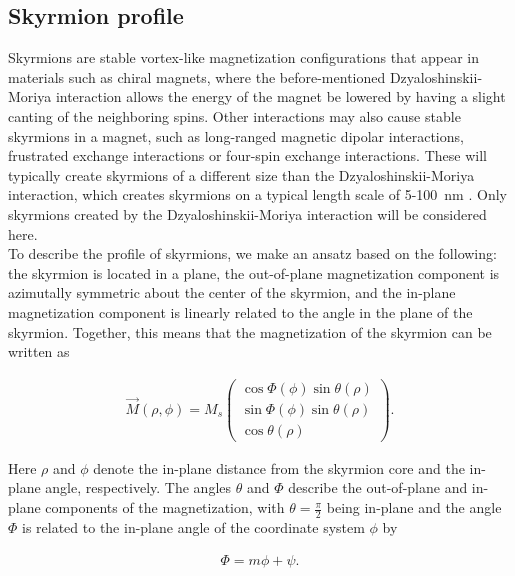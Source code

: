 \documentclass[1p]{elsarticle}		%
\numberwithin{equation}{section}
\begin{document}
\subsection{Skyrmion profile}
Skyrmions are stable vortex-like magnetization configurations that appear in materials such as chiral magnets, where the before-mentioned Dzyaloshinskii-Moriya interaction allows the energy of the magnet be lowered by having a slight canting of the neighboring spins. Other interactions may also cause stable skyrmions in a magnet, such as long-ranged magnetic dipolar interactions, frustrated exchange interactions or four-spin exchange interactions. These will typically create skyrmions of a different size than the Dzyaloshinskii-Moriya interaction, which creates skyrmions on a typical length scale of 5-\SI{100}{nm} \cite{Nagaosa2013}. Only skyrmions created by the Dzyaloshinskii-Moriya interaction will be considered here. \\
To describe the profile of skyrmions, we make an ansatz based on the following: the skyrmion is located in a plane, the out-of-plane magnetization component is azimutally symmetric about the center of the skyrmion, and the in-plane magnetization component is linearly related to the angle in the plane of the skyrmion. Together, this means that the magnetization of the skyrmion can be written as

\begin{align}
\label{eq:SkyrmionMVec}
\vec{M}(\rho, \phi) = M_s
\begin{pmatrix}
\cos\Phi(\phi)\sin\theta(\rho) \\ \sin\Phi(\phi)\sin\theta(\rho) \\ \cos\theta(\rho)
\end{pmatrix}.
\end{align}

Here $\rho$ and $\phi$ denote the in-plane distance from the skyrmion core and the in-plane angle, respectively. The angles $\theta$ and $\Phi$ describe the out-of-plane and in-plane components of the magnetization, with $\theta = \frac{\pi}{2}$ being in-plane and the angle $\Phi$ is related to the in-plane angle of the coordinate system $\phi$ by

\begin{align}
\label{eq:SkyrmionPhi}
\Phi = m\phi + \psi.
\end{align}
\end{document}
